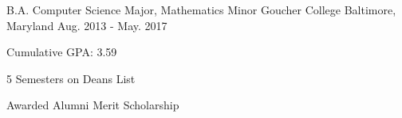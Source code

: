 

\begin{cventries}

  \cventry
    {B.A. Computer Science Major, Mathematics Minor} %
    {Goucher College} %
    {Baltimore, Maryland} %
    {Aug. 2013 - May. 2017} %
    {
      \begin{cvitems} %
        \item {Cumulative GPA: 3.59}
        \item {5 Semesters on Deans List}
        \item {Awarded Alumni Merit Scholarship}
      \end{cvitems}
    }

\end{cventries}
